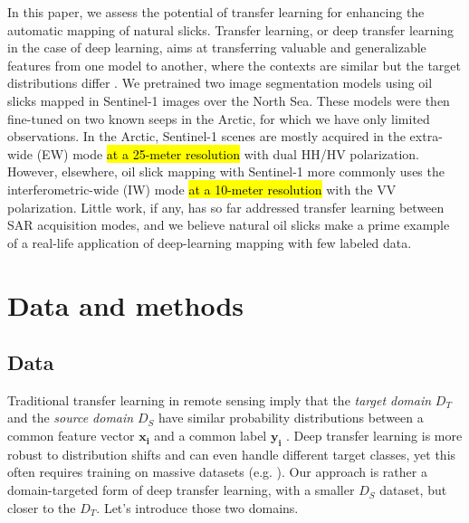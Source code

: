 \documentclass[journal]{IEEEtran}
\begin{document}
In this paper, we assess the potential of transfer learning for enhancing the automatic mapping of natural slicks. Transfer learning, or deep transfer learning in the case of deep learning, aims at 
transferring valuable and generalizable features from one model to another, where the contexts are similar but the target distributions differ \cite{goodfellowDeepLearning2016}. 
We pretrained two image segmentation models using oil slicks mapped in Sentinel-1 images over the North Sea. These models were then fine-tuned on two known seeps in the Arctic, for which we have only 
limited observations. In the Arctic, Sentinel-1 scenes are mostly acquired in the extra-wide (EW) mode \hl{at a 25-meter resolution} with dual HH/HV polarization. However, elsewhere, oil slick mapping with 
Sentinel-1 more commonly uses the interferometric-wide (IW) mode \hl{at a 10-meter resolution} with the VV polarization.
Little work, if any, has so far addressed transfer learning between SAR acquisition modes, and we believe natural oil slicks make a 
prime example of a real-life application of deep-learning mapping with few labeled data. 

\section{Data and methods}
\subsection{Data}
Traditional transfer learning in remote sensing imply that the \textit{target domain} $\mathit{D}_T$ and the \textit{source domain} $\mathit{D}_S$ have similar probability distributions 
between a common feature vector $\mathbf{x_i}$ and a common label $\mathbf{y_i}$ \cite{tuiaDomainAdaptationClassification2016}. Deep transfer learning is more robust to distribution shifts 
and can even handle different target classes, yet this often requires training on massive datasets (e.g. \cite{heDeepResidualLearning2015,kirillovSegmentAnything2023}). 
Our approach is rather a domain-targeted form of deep transfer learning, with a smaller $\mathit{D}_S$ dataset, but closer to the $\mathit{D}_T$. Let's introduce those two domains.
\end{document}
